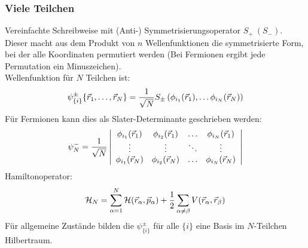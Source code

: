 \subsubsection{Viele Teilchen}
Vereinfachte Schreibweise mit (Anti-) Symmetrisierungsoperator $S_+\ (S_-)$.\\
Dieser macht aus dem Produkt von $n$ Wellenfunktionen die symmetrisierte Form, bei der alle Koordinaten permutiert werden (Bei Fermionen ergibt jede Permutation ein Minuszeichen).\\
Wellenfunktion für $N$ Teilchen ist:
\begin{eqnarray*} \psi_{\{i\}}^\pm \{\vec r_1, \dots,\vec r_N\} = \frac 1 {\sqrt N} S_\pm \left(\phi_{i_1}(\vec r_1), \dots \phi_{i_N}(\vec r_N)\right)
\end{eqnarray*}
Für Fermionen kann dies als Slater-Determinante  geschrieben werden:
\begin{eqnarray*}
\psi_N^- = \frac 1 {\sqrt N} \left| \begin{array}{cccc}\phi_{i_1}(\vec r_1) & \phi_{i_2}(\vec r_1) & \dots&\phi_{i_N}(\vec r_1)\\ \vdots& {\vdots}&{\ddots}&\vdots\\\phi_{i_1}(\vec r_N) & \phi_{i_2}(\vec r_N)&\dots&\phi_{i_N}(\vec r_N)\end{array}\right |
\end{eqnarray*}
Hamiltonoperator:
\begin{eqnarray*}
\mathcal H _N = \sum \limits_{\alpha = 1}^N \mathcal H (\vec r_{\alpha}, \vec p_\alpha ) + \frac 1 2 \sum \limits_{\alpha \neq \beta} V(\vec r_\alpha,\vec r_\beta ) \end{eqnarray*}
Für allgemeine Zustände bilden die $\psi_{\{i\}}^\pm$ für alle $\{i\}$ eine Basis im $N$-Teilchen Hilbertraum.

